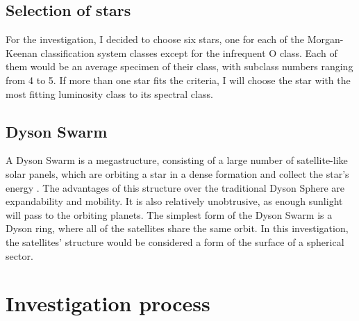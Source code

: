\documentclass[stu, 11pt, a4paper, floatsintext, noextraspace]{apa7}
\begin{document}
	\subsection{Selection of stars}
	For the investigation, I decided to choose six stars, one for each of the Morgan-Keenan classification system classes except for the infrequent O class. Each of them would be an average specimen of their class, with subclass numbers ranging from 4 to 5. If more than one star fits the criteria, I will choose the star with the most fitting luminosity class to its spectral class.
	\subsection{Dyson Swarm}
	A Dyson Swarm is a megastructure, consisting of a large number of satellite-like solar panels, which are orbiting a star in a dense formation and collect the star's energy \Parencite{kochai_pioneering_2020}. The advantages of this structure over the traditional Dyson Sphere are expandability and mobility. It is also relatively unobtrusive, as enough sunlight will pass to the orbiting planets. The simplest form of the Dyson Swarm is a Dyson ring, where all of the satellites share the same orbit. In this investigation, the satellites' structure would be considered a form of the surface of a spherical sector.
	\section{Investigation process}
\end{document}
